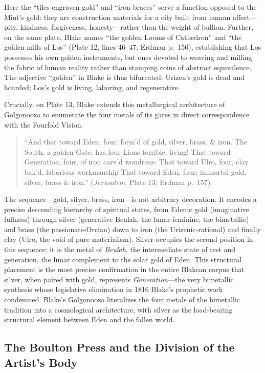 \documentclass[
]{article}
\begin{document}
Here the ``tiles engraven gold'' and ``iron braces'' serve a function
opposed to the Mint's gold: they are construction materials for a city
built from human affect---pity, kindness, forgiveness, honesty---rather
than the weight of bullion. Further, on the same plate, Blake names
``the golden Looms of Cathedron'' and ``the golden mills of Los'' (Plate
12, lines 46--47; Erdman p.~156), establishing that Los possesses his
own golden instruments, but ones devoted to weaving and milling the
fabric of human reality rather than stamping coins of abstract
equivalence. The adjective ``golden'' in Blake is thus bifurcated:
Urizen's gold is dead and hoarded; Los's gold is living, laboring, and
regenerative.

Crucially, on Plate 13, Blake extends this metallurgical architecture of
Golgonooza to enumerate the four metals of its gates in direct
correspondence with the Fourfold Vision:

\begin{quote}
``And that toward Eden, four, form'd of gold, silver, brass, \& iron.
The South, a golden Gate, has four Lions terrible, living! That toward
Generation, four, of iron carv'd wondrous: That toward Ulro, four, clay
bak'd, laborious workmanship That toward Eden, four; immortal gold,
silver, brass \& iron.'' (\emph{Jerusalem}, Plate 13; Erdman p.~157)
\citep{erdman1988complete}
\end{quote}

The sequence---gold, silver, brass, iron---is not arbitrary decoration.
It encodes a precise descending hierarchy of spiritual states, from
Edenic gold (imaginative fullness) through silver (generative Beulah,
the lunar-feminine, the bimetallic) and brass (the passionate-Orcian)
down to iron (the Urizenic-rational) and finally clay (Ulro, the void of
pure materialism). Silver occupies the second position in this sequence:
it is the metal of \emph{Beulah}, the intermediate state of rest and
generation, the lunar complement to the solar gold of Eden. This
structural placement is the most precise confirmation in the entire
Blakean corpus that silver, when paired with gold, represents
\emph{Generation}---the very bimetallic synthesis whose legislative
elimination in 1816 Blake's prophetic work condemned. Blake's Golgonooza
literalizes the four metals of the bimetallic tradition into a
cosmological architecture, with silver as the load-bearing structural
element between Eden and the fallen world.

\subsection{The Boulton Press and the Division of the Artist's
Body}\label{the-boulton-press-and-the-division-of-the-artists-body}
\end{document}
